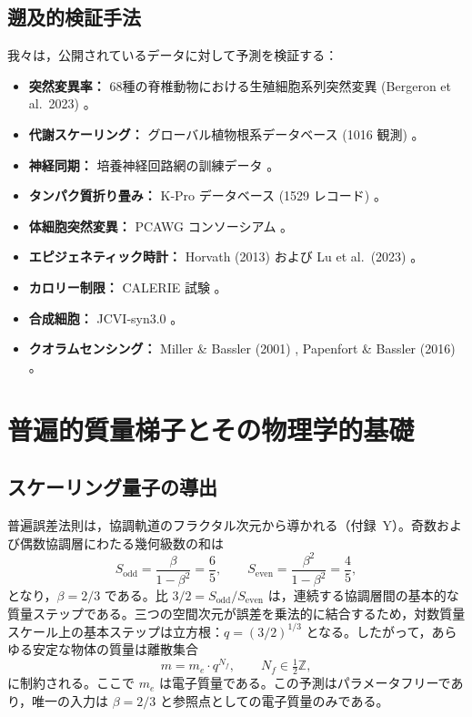 \documentclass[11pt,a4paper]{article}
\begin{document}
	\subsection{遡及的検証手法}
	
	我々は，公開されているデータに対して予測を検証する：
	\begin{itemize}
		\item \textbf{突然変異率：} 68種の脊椎動物における生殖細胞系列突然変異 (Bergeron et al.\ 2023) \cite{Bergeron2023a}。
		\item \textbf{代謝スケーリング：} グローバル植物根系データベース (1016 観測) \cite{Yuan2020}。
		\item \textbf{神経同期：} 培養神経回路網の訓練データ \cite{PLOS2025b}。
		\item \textbf{タンパク質折り畳み：} K‑Pro データベース (1529 レコード) \cite{Turina2023}。
		\item \textbf{体細胞突然変異：} PCAWG コンソーシアム \cite{PCAWG2020}。
		\item \textbf{エピジェネティック時計：} Horvath (2013) および Lu et al.\ (2023) \cite{Horvath2013, Lu2023}。
		\item \textbf{カロリー制限：} CALERIE 試験 \cite{CALERIE2018, CALERIE2024}。
		\item \textbf{合成細胞：} JCVI‑syn3.0 \cite{Hutchison2016, Pelletier2023}。
		\item \textbf{クオラムセンシング：} Miller \& Bassler (2001) \cite{Miller2001}, Papenfort \& Bassler (2016) \cite{Papenfort2016}。
	\end{itemize}
	
	\section{普遍的質量梯子とその物理学的基礎}
	
	\subsection{スケーリング量子の導出}
	
	普遍誤差法則は，協調軌道のフラクタル次元から導かれる（付録~Y）。奇数および偶数協調層にわたる幾何級数の和は
	\[
	S_{\mathrm{odd}} = \frac{\beta}{1-\beta^2} = \frac{6}{5}, \qquad
	S_{\mathrm{even}} = \frac{\beta^2}{1-\beta^2} = \frac{4}{5},
	\]
	となり，\(\beta = 2/3\) である。比 \(3/2 = S_{\mathrm{odd}}/S_{\mathrm{even}}\) は，連続する協調層間の基本的な質量ステップである。三つの空間次元が誤差を乗法的に結合するため，対数質量スケール上の基本ステップは立方根：\(q = (3/2)^{1/3}\) となる。したがって，あらゆる安定な物体の質量は離散集合
	\begin{equation}
		m = m_e \cdot q^{N_f}, \qquad N_f \in \tfrac12\mathbb{Z},
		\label{eq:quantization}
	\end{equation}
	に制約される。ここで \(m_e\) は電子質量である。この予測はパラメータフリーであり，唯一の入力は \(\beta = 2/3\) と参照点としての電子質量のみである。
	
\end{document}
